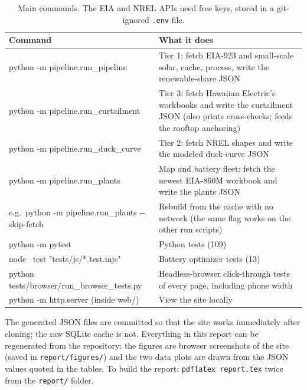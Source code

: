 \documentclass[11pt,a4paper]{article}
\newcommand{\code}[1]{\nolinkurl{#1}}      %
\begin{document}
\begin{table}[htbp]
\centering\small
\begin{tabularx}{\textwidth}{@{}>{\ttfamily\raggedright\arraybackslash}p{6.4cm}X@{}}
\toprule
\normalfont Command & \normalfont What it does \\
\midrule
python -m pipeline.run\_pipeline & Tier 1: fetch EIA-923 and small-scale solar, cache, process, write the renewable-share JSON \\
python -m pipeline.run\_curtailment & Tier 3: fetch Hawaiian Electric's workbooks and write the curtailment JSON (also prints cross-checks; feeds the rooftop anchoring) \\
python -m pipeline.run\_duck\_curve & Tier 2: fetch NREL shapes and write the modeled duck-curve JSON \\
python -m pipeline.run\_plants & Map and battery fleet: fetch the newest EIA-860M workbook and write the plants JSON \\
e.g.\ python -m pipeline.run\_plants -{}-skip-fetch & Rebuild from the cache with no network (the same flag works on the other run scripts) \\
python -m pytest & Python tests (109) \\
node --test "tests/js/*.test.mjs" & Battery optimizer tests (13) \\
python tests/browser/run\_browser\_tests.py & Headless-browser click-through tests of every page, including phone width \\
python -m http.server (inside web/) & View the site locally \\
\bottomrule
\end{tabularx}
\caption{Main commands. The EIA and NREL APIs need free keys, stored in a git-ignored \texttt{.env} file.}
\end{table}

The generated JSON files are committed so that the site works immediately after cloning; the raw SQLite cache is
not. Everything in this report can be regenerated from the repository: the figures are browser screenshots
of the site (saved in \code{report/figures/}) and the two data plots are drawn from the JSON values quoted in the tables.
To build the report: \texttt{pdflatex report.tex} twice from the \code{report/} folder.
\end{document}
